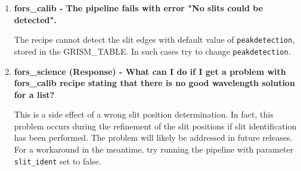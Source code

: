 \begin{enumerate}
 \item {\bf fors\_calib - The pipeline fails with error "No slits could be detected".}
 
The recipe cannot detect the slit edges with default value of {\tt peakdetection}, stored in the GRISM\_TABLE. In such cases try to change {\tt peakdetection}.

\item {\bf fors\_science (Response) - What can I do if I get a problem with fors\_calib recipe stating that there is no good wavelength solution for a list?}

This is a side effect of a wrong slit position determination. In fact, this problem occurs during the refinement of the slit positions if slit identification has been performed. The problem will likely be addressed in future releases. For a workaround in the meantime, try running the pipeline with parameter
{\tt slit\_ident} set to false.

\end{enumerate}
